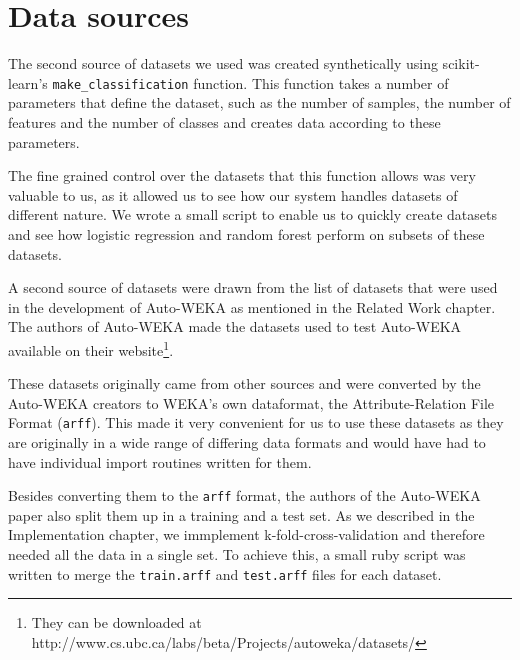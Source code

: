 \documentclass[a4paper,12pt,twoside,openright]{report}
\begin{document}



\section{Data sources}


The second source of datasets we used was created synthetically using scikit-learn's \texttt{make\_classification} function. This function takes a number of parameters that define the dataset, such as the number of samples, the number of features and the number of classes and creates data according to these parameters. 

The fine grained control over the datasets that this function allows was very valuable to us, as it allowed us to see how our system handles datasets of different nature. We wrote a small script to enable us to quickly create datasets and see how logistic regression and random forest perform on subsets of these datasets.

A second source of datasets were drawn from the list of datasets that were used in the development of Auto-WEKA as mentioned in the Related Work chapter. The authors of Auto-WEKA made the datasets used to test Auto-WEKA available on their website\footnote{They can be downloaded at http://www.cs.ubc.ca/labs/beta/Projects/autoweka/datasets/}.



These datasets originally came from other sources \cite{Lichman:2013, Larochelle:2007:EED:1273496.1273556, Krizhevsky09learningmultiple} and were converted by the Auto-WEKA creators to WEKA's own dataformat, the Attribute-Relation File Format (\texttt{arff}). This made it very convenient for us to use these datasets as they are originally in a wide range of differing data formats and would have had to have individual import routines written for them. 

Besides converting them to the \texttt{arff} format, the authors of the Auto-WEKA paper also split them up in a training and a test set. As we described in the Implementation chapter, we immplement k-fold-cross-validation and therefore needed all the data in a single set. To achieve this, a small ruby script was written to merge the \texttt{train.arff} and \texttt{test.arff} files for each dataset.
\end{document}

